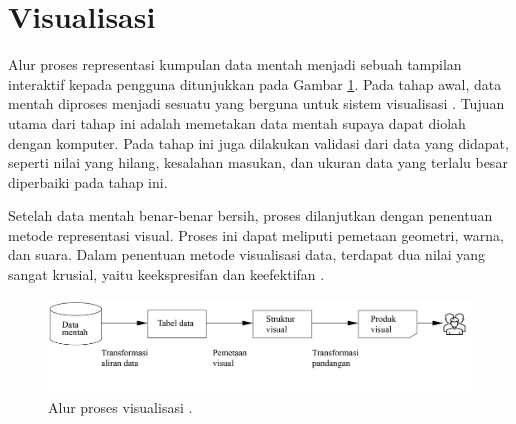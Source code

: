 \section{Visualisasi}
Alur proses representasi kumpulan data mentah menjadi sebuah tampilan interaktif kepada pengguna ditunjukkan pada Gambar \ref{fig:visual-pipeline}. Pada tahap awal, data mentah diproses menjadi sesuatu yang berguna untuk sistem visualisasi \cite{buku_visual}. Tujuan utama dari tahap ini adalah memetakan data mentah supaya dapat diolah dengan komputer. Pada tahap ini juga dilakukan validasi dari data yang didapat, seperti nilai yang hilang, kesalahan masukan, dan ukuran data yang terlalu besar diperbaiki pada tahap ini. \par
Setelah data mentah benar-benar bersih, proses dilanjutkan dengan penentuan metode representasi visual. Proses ini dapat meliputi pemetaan geometri, warna, dan suara. Dalam penentuan metode visualisasi data, terdapat dua nilai yang sangat krusial, yaitu keekspresifan dan keefektifan \cite{buku_visual}. \par 
\begin{figure}[t!]
    \centering
    \includegraphics[width = 13 cm]{Gambar/visualisasi-pipeline.jpg}
    \caption{Alur proses visualisasi \cite{buku_visual}.}
    \label{fig:visual-pipeline}
\end{figure}
